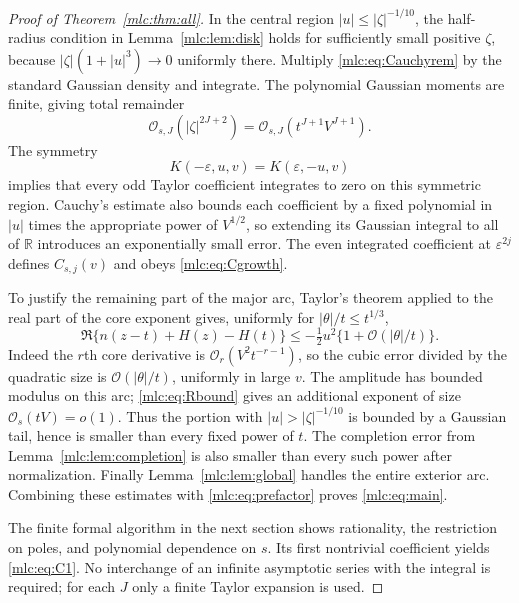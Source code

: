 \documentclass[11pt]{article}
\theoremstyle{remark}\newtheorem{remark}[theorem]{Remark}
\newcommand{\OO}{\mathcal O}
\newcommand{\eps}{\varepsilon}
\newcommand{\R}{\mathbb R}
\begin{document}
\begin{proof}[Proof of Theorem~\ref{mlc:thm:all}]
In the central region $|u|\le|\zeta|^{-1/10}$, the half-radius condition in Lemma~\ref{mlc:lem:disk} holds for sufficiently small positive $\zeta$, because $|\zeta|(1+|u|^3)\to0$ uniformly there. Multiply \eqref{mlc:eq:Cauchyrem} by the standard Gaussian density and integrate. The polynomial Gaussian moments are finite, giving total remainder
\begin{equation}\label{mlc:eq:intrem}
 \OO_{s,J}(|\zeta|^{2J+2})
              =\OO_{s,J}(t^{J+1}V^{J+1}).
\end{equation}
The symmetry
\begin{equation}\label{mlc:eq:parity}
 K(-\eps,u,v)=K(\eps,-u,v)
\end{equation}
implies that every odd Taylor coefficient integrates to zero on this symmetric region. Cauchy's estimate also bounds each coefficient by a fixed polynomial in $|u|$ times the appropriate power of $V^{1/2}$, so extending its Gaussian integral to all of $\R$ introduces an exponentially small error. The even integrated coefficient at $\eps^{2j}$ defines $C_{s,j}(v)$ and obeys \eqref{mlc:eq:Cgrowth}.

To justify the remaining part of the major arc, Taylor's theorem applied to the real part of the core exponent gives, uniformly for $|\theta|/t\le t^{1/3}$,
\begin{equation}\label{mlc:eq:gaussiandrop}
 \Re\{n(z-t)+H(z)-H(t)\}
             \le -\tfrac12u^2\{1+\OO(|\theta|/t)\}.
\end{equation}
Indeed the $r$th core derivative is $\OO_r(V^2t^{-r-1})$, so the cubic error divided by the quadratic size is $\OO(|\theta|/t)$, uniformly in large $v$. The amplitude has bounded modulus on this arc; \eqref{mlc:eq:Rbound} gives an additional exponent of size $\OO_s(tV)=o(1)$. Thus the portion with $|u|>|\zeta|^{-1/10}$ is bounded by a Gaussian tail, hence is smaller than every fixed power of $t$. The completion error from Lemma~\ref{mlc:lem:completion} is also smaller than every such power after normalization. Finally Lemma~\ref{mlc:lem:global} handles the entire exterior arc. Combining these estimates with \eqref{mlc:eq:prefactor} proves \eqref{mlc:eq:main}.

The finite formal algorithm in the next section shows rationality, the restriction on poles, and polynomial dependence on $s$. Its first nontrivial coefficient yields \eqref{mlc:eq:C1}. No interchange of an infinite asymptotic series with the integral is required; for each $J$ only a finite Taylor expansion is used.
\end{proof}
\end{document}
